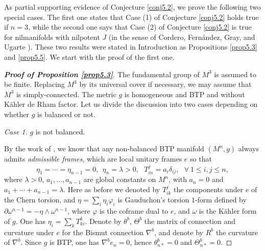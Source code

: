 \documentclass{amsart}
\numberwithin{equation}{section}
\theoremstyle{definition}
\renewcommand{\1}{\mathds{1}}
\renewcommand{\>}{\rightarrow}
\begin{document}
As partial supporting evidence of Conjecture \ref{conj5.2}, we prove the following two special cases. The first one states that Case (1) of Conjecture \ref{conj5.2} holds true if $n=3$, while the second one says that Case (2) of Conjecture \ref{conj5.2} is true for nilmanifolds with nilpotent $J$ (in the sense of Cordero, Fern\'{a}ndez, Gray, and Ugarte \cite{CFGU}). These two results were stated in Introduction as Propositions \ref{prop5.3} and \ref{prop5.5}.  We start with the proof of the first one.

\begin{proof}[{\bf Proof of Proposition \ref{prop5.3}}]
The fundamental group of $M^3$ is assumed to be finite. Replacing $M^3$ by its universal cover if necessary, we may assume that $M^3$ is simply-connected. The metric $g$ is homogeneous and {\rm BTP} and without K\"ahler de Rham factor. Let us divide the discussion into two cases depending on whether $g$ is balanced or not.

{\em Case 1.} $g$ is not balanced.

By the work of \cite{ZhaoZ22}, we know that any non-balanced {\rm BTP} manifold $(M^n,g)$ always admits {\em admissible frames}, which are local unitary frames $e$ so that
$$ \eta_1= \cdots = \eta_{n-1}=0, \ \ \eta_n=\lambda >0, \ \ \ T^j_{in}=a_i\delta_{ij} , \ \ \ \forall \ 1\leq i,j\leq n,$$
where $\lambda >0$, $a_1, \ldots , a_{n-1}$ are global constants on $M^n$, with $a_n=0$ and $a_1+ \cdots + a_{n-1}=\lambda$.  Here as before we denoted by $T^j_{ik}$ the components under $e$ of the Chern torsion, and $\eta = \sum_i \eta_i\varphi_i$ is Gauduchon's torsion $1$-form defined by $\partial \omega^{n-1} = -\eta \wedge \omega^{n-1}$, where $\varphi$ is the coframe dual to $e$, and $\omega$ is the K\"ahler form of $g$. One has $\eta_i = \sum_k T^k_{ki}$. Denote by $\theta^b$, $\Theta^b$ the matrix of connection and curvature under $e$ for the Bismut connection $\nabla^b$, and denote by $R^b$ the curvature of $\nabla^b$. Since $g$ is {\rm BTP}, one has $\nabla^b e_n=0$, hence $\theta^b_{n\ast}=0$ and $\Theta^b_{n\ast}=0$.



\end{proof}
\end{document}
